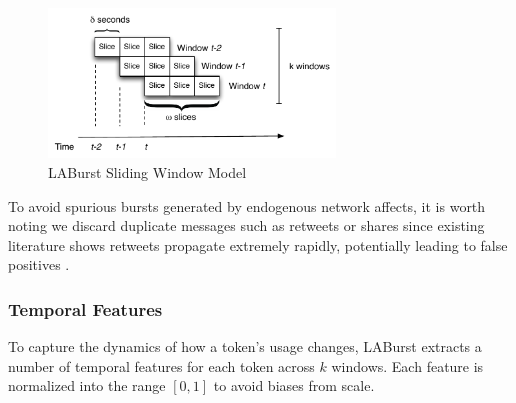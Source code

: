 \documentclass[letterpaper]{article}
\begin{document}
\begin{figure}[hbtp]
\begin{center}
\includegraphics[width=3in]{./figures/laburst.pdf}
\caption{LABurst Sliding Window Model}
\label{fig:windowSlices}
\end{center}
\end{figure}

To avoid spurious bursts generated by endogenous network affects, it is worth noting we discard duplicate messages such as retweets or shares since existing literature shows retweets propagate extremely rapidly, potentially leading to false positives \cite{kwak2010twitter}.

\subsubsection{Temporal Features}

To capture the dynamics of how a token's usage changes, LABurst extracts a number of temporal features for each token across $k$ windows.
Each feature is normalized into the range $[0, 1]$ to avoid biases from scale.
\end{document}
